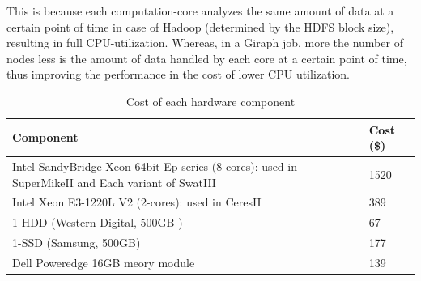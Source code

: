 \documentclass[conference]{IEEEtran}
\begin{document}
This is because each computation-core analyzes the same amount of data at a certain point of time in case of Hadoop (determined by the HDFS block size), resulting in full CPU-utilization. Whereas, in a Giraph job, more the number of nodes less is the amount of data handled by each core at a certain point of time, thus improving the performance in the cost of lower CPU utilization.
\begin{table}
\begin{center}
	\begin{tabular}{ |p{5cm} | p{3cm} |} \hline
		Component & Cost (\$)\\ \hline
		Intel SandyBridge Xeon 64bit Ep series (8-cores): used in SuperMikeII and Each variant of SwatIII & 1520\\ \hline
		Intel Xeon E3-1220L V2 (2-cores): used in CeresII & 389\\ \hline
		1-HDD (Western Digital, 500GB ) & 67\\ \hline
		1-SSD (Samsung, 500GB) & 177\\ \hline
		Dell Poweredge 16GB meory module & 139\\ \hline
	\end{tabular}
	\caption{Cost of each hardware component}
	\label{table:PriceOfEachComponent}
\end{center}
\end{table}
\end{document}
